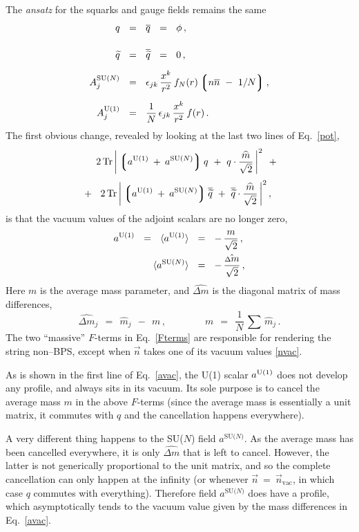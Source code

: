 \documentclass[12pt]{article}
\def\beq{\begin{equation}}
\def\eeq{\end{equation}}
\newcommand{\wt}{\widetilde}
\newcommand{\ov}{\overline}
\newcommand{\lgr}{\left\lgroup}
\newcommand{\rgr}{\right\rgroup}
\newcommand{\aU}{a^{\rm U(1)}}
\newcommand{\aN}{a^\text{SU($N$)}}
\newcommand{\nnbar}{n\ov{n}}
\newcommand{\qt}{\wt{q}}
\newcommand{\bq}{\ov{q}}
\newcommand{\bqt}{\overline{\widetilde{q}}}
\newcommand{\Tr}{\text{Tr}}
\newcommand{\dm}{\hat{{\scriptstyle \Delta} m}}
\newcommand{\mhat}{\widehat{m}}
\newcommand{\nvac}{\vec{n}{}_\text{vac}}
\newcommand{\ansatz}{{\it ansatz} }
\begin{document}
	The \ansatz for the squarks and gauge fields remains the same
\begin{align}
%
\notag
	q    & ~~=~~    \bq    ~~=~~    \phi\,,    \\[4mm]
%
\notag
	\qt    & ~~=~~    \bqt    ~~=~~    0\,,    \\[2mm]
%
\label{qAansatz}
	A_j^\text{SU($N$)}    & ~~=~~    \epsilon_{jk}\, \frac{x^k}{r^2}\, f_N(r) \lgr \nnbar ~-~ 1/N \rgr ,
	\\[2mm]
%
\notag
	A_j^\text{U(1)}    & ~~=~~    \frac{1}{N}\, \epsilon_{jk}\, \frac{x^k}{r^2}\, f(r)\,.
\end{align}
	The first obvious change, revealed by looking at the last two lines of Eq.~\eqref{pot}, 
\begin{align}
%
\notag
	&
	\phantom{~~+~~}
	2\, \Tr\, \bigg| \lgr \aU \:+\: \aN \rgr q  ~+~  q \cdot \frac{\mhat}{\sqrt{2}} \,\bigg|^2
	~~+~~
	\\[1mm]
%
\label{Fterms}
	&
	~~+~~
	2\, \Tr\, \bigg| \lgr \aU \:+\: \aN \rgr \bqt  ~+~  \bqt \cdot \frac{\mhat}{\sqrt{2}} \,\bigg|^2
	\,,
\end{align}
	is that the vacuum values of the adjoint scalars are no longer zero,
\begin{align}
%
\notag
	\aU    ~~=~~    \langle \aU \rangle    & ~~=~~    -\, \frac{m}{\sqrt{2}}\,,
	\\
%
\label{avac}
	\langle \aN \rangle    & ~~=~~ -\, \frac{\dm}{\sqrt{2}}\,,
\end{align}
	Here $ m $ is the average mass parameter, and $ \dm $ is the diagonal matrix of mass differences,
\beq
	\dm{}_j    ~~=~~    \mhat{}_j  ~~-~~  m\,,
	\qquad\qquad
	m    ~~=~~ \frac{1}{N}\, \sum\, \mhat{}_j\,.
\eeq
	The two ``massive'' $ F $-terms in Eq.~\eqref{Fterms} are responsible for rendering the string 
	non--BPS, except when $ \vec{n} $ takes one of its vacuum values \eqref{nvac}.
	
	As is shown in the first line of Eq.~\eqref{avac}, the U(1) scalar $ \aU $ does not develop
	any profile, and always sits in its vacuum.
	Its sole purpose is to cancel the average mass $ m $ in the above $ F $-terms 
	(since the average mass is essentially a unit matrix, it commutes with $ q $ and the 
	cancellation happens everywhere).

	A very different thing happens to the SU($N$) field $ \aN $.
	As the average mass has been cancelled everywhere, it is only $ \dm $ that is left to cancel.
	However, the latter is not generically proportional to the unit matrix, and so the complete cancellation
	can only happen at the infinity (or whenever $ \vec{n} ~=~ \nvac $, in which
	case $ q $ commutes with everything).
	Therefore field $ \aN $ does have a profile, 
	which asymptotically tends to the vacuum value given by the mass differences in Eq.~\eqref{avac}.
\end{document}

